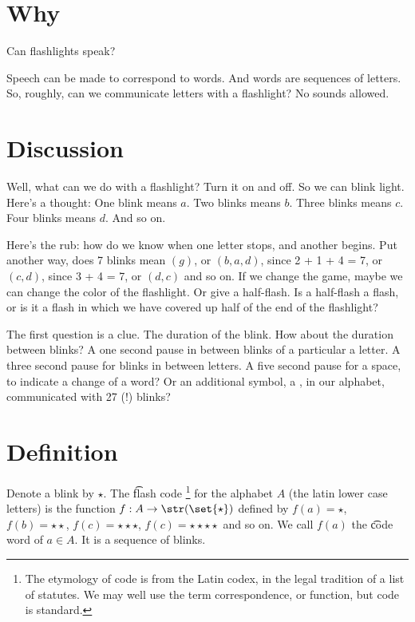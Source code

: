 
\section*{Why}

Can flashlights speak?

Speech can be made to correspond to words.
And words are sequences of letters.
So, roughly, can we communicate letters with a flashlight?
No sounds allowed.

\section*{Discussion}

Well, what can we do with a flashlight?
Turn it on and off.
So we can blink light.
Here's a thought:
One blink means $a$.
Two blinks means $b$.
Three blinks means $c$.
Four blinks means $d$.
And so on.

Here's the rub: how do we know when one letter stops, and another begins.
Put another way, does 7 blinks mean $(g)$, or $(b, a, d)$, since 2 + 1 + 4 = 7, or $(c, d)$, since 3 + 4 = 7, or $(d, c)$ and so on.
If we change the game, maybe we can change the color of the flashlight.
Or give a half-flash.
Is a half-flash a  flash, or is it a flash in which we have covered up half of the end of the flashlight?

The first question is a clue.
The duration of the blink.
How about the duration between blinks?
A one second pause in between blinks of a particular a letter.
A three second pause for blinks in between letters.
A five second pause for a space, to indicate a change of a word?
Or an additional symbol, a , in our alphabet, communicated with 27 (!) blinks?

\section*{Definition}

\newcommand{\blink}{\star}
\newcommand{\pause}{\square}
Denote a blink by $\blink$.
The \t{flash code}
  \ifhmode\unskip\fi\footnote{
The etymology of code is from the Latin codex, in the legal tradition of a list of statutes. We may well use the term correspondence, or function, but code is standard.
  }
for the alphabet $A$ (the latin lower case letters) is the function $f: A \to \str(\set{\blink})$ defined by $f(a) = \blink$, $f(b) = \blink\blink$, $f(c) = \blink\blink\blink$, $f(c) = \blink\blink\blink\blink$ and so on.
We call $f(a)$ the \t{code word} of $a \in A$.
It is a sequence of blinks.

